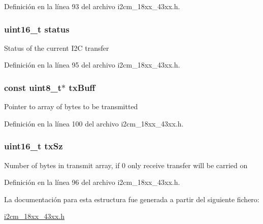 Definición en la línea 93 del archivo i2cm\+\_\+18xx\+\_\+43xx.\+h.

\subsubsection[{\texorpdfstring{status}{status}}]{\setlength{\rightskip}{0pt plus 5cm}uint16\+\_\+t status}\hypertarget{struct_i2_c_m___x_f_e_r___t_a5393c99e246925076b1dfd69a64177ef}{}\label{struct_i2_c_m___x_f_e_r___t_a5393c99e246925076b1dfd69a64177ef}
Status of the current I2C transfer 

Definición en la línea 95 del archivo i2cm\+\_\+18xx\+\_\+43xx.\+h.

\subsubsection[{\texorpdfstring{tx\+Buff}{txBuff}}]{\setlength{\rightskip}{0pt plus 5cm}const uint8\+\_\+t$\ast$ tx\+Buff}\hypertarget{struct_i2_c_m___x_f_e_r___t_aa273a5a6ef5e2426562692030769f5d8}{}\label{struct_i2_c_m___x_f_e_r___t_aa273a5a6ef5e2426562692030769f5d8}
Pointer to array of bytes to be transmitted 

Definición en la línea 100 del archivo i2cm\+\_\+18xx\+\_\+43xx.\+h.

\subsubsection[{\texorpdfstring{tx\+Sz}{txSz}}]{\setlength{\rightskip}{0pt plus 5cm}uint16\+\_\+t tx\+Sz}\hypertarget{struct_i2_c_m___x_f_e_r___t_ae528037278b667566b4c8caac3167b91}{}\label{struct_i2_c_m___x_f_e_r___t_ae528037278b667566b4c8caac3167b91}
Number of bytes in transmit array, if 0 only receive transfer will be carried on 

Definición en la línea 96 del archivo i2cm\+\_\+18xx\+\_\+43xx.\+h.



La documentación para esta estructura fue generada a partir del siguiente fichero\+:\begin{DoxyCompactItemize}
\item 
\hyperlink{i2cm__18xx__43xx_8h}{i2cm\+\_\+18xx\+\_\+43xx.\+h}\end{DoxyCompactItemize}
